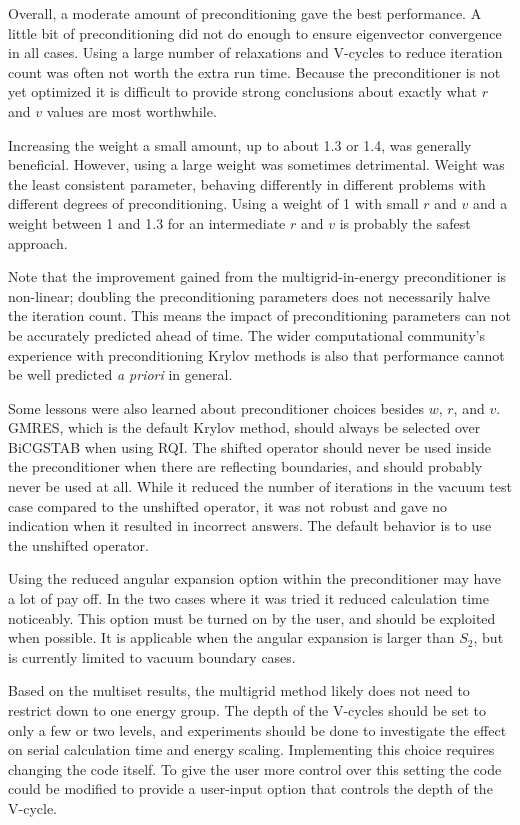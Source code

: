 Overall, a moderate amount of preconditioning gave the best performance. A little bit of preconditioning did not do enough to ensure eigenvector convergence in all cases. Using a large number of relaxations and V-cycles to reduce iteration count was often not worth the extra run time. Because the preconditioner is not yet optimized it is difficult to provide strong conclusions about exactly what $r$ and $v$ values are most worthwhile. 
 
Increasing the weight a small amount, up to about 1.3 or 1.4, was generally beneficial. However, using a large weight was sometimes detrimental. Weight was the least consistent parameter, behaving differently in different problems with different degrees of preconditioning. Using a weight of 1 with small $r$ and $v$ and a weight between 1 and 1.3 for an intermediate $r$ and $v$ is probably the safest approach. 

Note that the improvement gained from the multigrid-in-energy preconditioner is non-linear; doubling the preconditioning parameters does not necessarily halve the iteration count. This means the impact of preconditioning parameters can not be accurately predicted ahead of time. The wider computational community's experience with preconditioning Krylov methods is also that performance cannot be well predicted \emph{a priori} in general.

Some lessons were also learned about preconditioner choices besides $w$, $r$, and $v$. GMRES, which is the default Krylov method, should always be selected over BiCGSTAB when using RQI. The shifted operator should never be used inside the preconditioner when there are reflecting boundaries, and should probably never be used at all. While it reduced the number of iterations in the vacuum test case compared to the unshifted operator, it was not robust and gave no indication when it resulted in incorrect answers. The default behavior is to use the unshifted operator. 

Using the reduced angular expansion option within the preconditioner may have a lot of pay off. In the two cases where it was tried it reduced calculation time noticeably. This option must be turned on by the user, and should be exploited when possible. It is applicable when the angular expansion is larger than $S_{2}$, but is currently limited to vacuum boundary cases.

Based on the multiset results, the multigrid method likely does not need to restrict down to one energy group. The depth of the V-cycles should be set to only a few or two levels, and experiments should be done to investigate the effect on serial calculation time and energy scaling. Implementing this choice requires changing the code itself. To give the user more control over this setting the code could be modified to provide a user-input option that controls the depth of the V-cycle.

